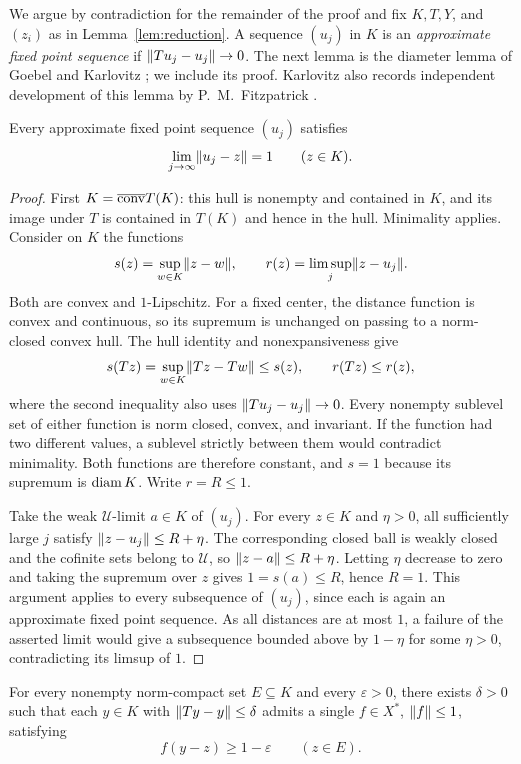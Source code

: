 We argue by contradiction for the remainder of the proof and fix
$K,T,Y$, and $(z_i)$ as in Lemma~\ref{lem:reduction}.
A sequence $(u_j)$ in $K$ is an \emph{approximate fixed point sequence}
if $\lVert Tu_j-u_j\rVert\to0$.
The next lemma is the diameter lemma of Goebel and Karlovitz
\cite{Goebel1975,Karlovitz1976}; we include its proof.
Karlovitz also records independent development of this lemma by
P.~M.~Fitzpatrick \cite[p.~159]{Karlovitz1976}.

\begin{lemma}\label{lem:diametral}
Every approximate fixed point sequence $(u_j)$ satisfies
\[
                     \lim_{j\to\infty}\lVert u_j-z\rVert=1
                     \qquad(z\in K).
\]
\end{lemma}

\begin{proof}
First $K=\overline{\operatorname{conv}}T(K)$: this hull is nonempty and contained in
$K$, and its image under $T$ is contained in $T(K)$ and hence in the hull.
Minimality applies. Consider on $K$ the functions
\[
       s(z)=\sup_{w\in K}\lVert z-w\rVert,
       \qquad r(z)=\limsup_j\lVert z-u_j\rVert.
\]
Both are convex and $1$-Lipschitz. For a fixed center, the distance
function is convex and continuous, so its supremum is unchanged on
passing to a norm-closed convex hull. The hull identity and
nonexpansiveness give
\[
 s(Tz)=\sup_{w\in K}\lVert Tz-Tw\rVert\leq s(z),
 \qquad r(Tz)\leq r(z),
\]
where the second inequality also uses $\lVert Tu_j-u_j\rVert\to0$.
Every nonempty sublevel set of either function is norm closed, convex,
and invariant. If the function had two different values, a sublevel
strictly between them would contradict minimality. Both functions
are therefore constant, and $s=1$ because its supremum is $\operatorname{diam} K$.
Write $r=R\leq1$.

Take the weak $\mathcal U$-limit $a\in K$ of $(u_j)$. For every $z\in K$
and $\eta>0$, all sufficiently large $j$ satisfy
$\lVert z-u_j\rVert\leq R+\eta$. The corresponding closed ball is weakly
closed and the cofinite sets belong to $\mathcal U$, so
$\lVert z-a\rVert\leq R+\eta$. Letting $\eta$ decrease to zero and taking
the supremum over $z$ gives $1=s(a)\leq R$, hence $R=1$.
This argument applies to every subsequence of $(u_j)$, since each is
again an approximate fixed point sequence. As all distances are at most
$1$, a failure of the asserted limit would give a subsequence bounded
above by $1-\eta$ for some $\eta>0$, contradicting its limsup of $1$.
\end{proof}

\begin{lemma}\label{lem:compact-detector}
For every nonempty norm-compact set $E\subseteq K$ and every
$\varepsilon>0$, there exists $\delta>0$ such that each $y\in K$ with
$\lVert Ty-y\rVert\leq\delta$ admits a single $f\in X^*$, $\lVert f\rVert\leq1$,
satisfying
\[
                     f(y-z)\geq1-\varepsilon\qquad(z\in E).
\]
\end{lemma}

